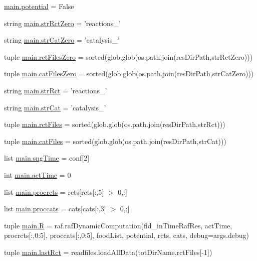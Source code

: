 \begin{DoxyCompactItemize}
\item 
\hyperlink{a00111_abe4c267a63409b1b7cd9c6aaf0779b4a}{main.\-potential} = False
\item 
string \hyperlink{a00111_adbfa32333003aa707723362b43bc11ff}{main.\-str\-Rct\-Zero} = 'reactions\-\_\-'
\item 
string \hyperlink{a00111_a6bb1e2c0e0d0a9e63313c082ee4eec76}{main.\-str\-Cat\-Zero} = 'catalysis\-\_\-'
\item 
tuple \hyperlink{a00111_aa37eddd86a00bf98dff8cc9260d6d13b}{main.\-rct\-Files\-Zero} = sorted(glob.\-glob(os.\-path.\-join(res\-Dir\-Path,str\-Rct\-Zero)))
\item 
tuple \hyperlink{a00111_a7ab6089d577bd60acf22b92e84930523}{main.\-cat\-Files\-Zero} = sorted(glob.\-glob(os.\-path.\-join(res\-Dir\-Path,str\-Cat\-Zero)))
\item 
string \hyperlink{a00111_a28a37e653a4c0984df32f8d83c3596ff}{main.\-str\-Rct} = 'reactions\-\_\-'
\item 
string \hyperlink{a00111_ab12df661b7defb4d7077777ad7d6352d}{main.\-str\-Cat} = 'catalysis\-\_\-'
\item 
tuple \hyperlink{a00111_a9016a8f5eafe76e4e8dbb1bc3ce94af5}{main.\-rct\-Files} = sorted(glob.\-glob(os.\-path.\-join(res\-Dir\-Path,str\-Rct)))
\item 
tuple \hyperlink{a00111_a189dc9cf606d870dacab059d5e7dca24}{main.\-cat\-Files} = sorted(glob.\-glob(os.\-path.\-join(res\-Dir\-Path,str\-Cat)))
\item 
list \hyperlink{a00111_ab4296f1ae2e4c4bb597ca27e84849510}{main.\-sng\-Time} = conf\mbox{[}2\mbox{]}
\item 
int \hyperlink{a00111_a9c2013c88f8354ccf6504c51843f1d5e}{main.\-act\-Time} = 0
\item 
list \hyperlink{a00111_a2120e8355b3501aed0114a74091d56c1}{main.\-procrcts} = rcts\mbox{[}rcts\mbox{[}\-:,5\mbox{]} $>$ 0,\-:\mbox{]}
\item 
list \hyperlink{a00111_a4e3c4b627d098aef6c7905cb20683e07}{main.\-proccats} = cats\mbox{[}cats\mbox{[}\-:,3\mbox{]} $>$ 0,\-:\mbox{]}
\item 
tuple \hyperlink{a00111_aa51f04a64cdea4fbde3c2d484d06d443}{main.\-R} = raf.\-raf\-Dynamic\-Computation(fid\-\_\-in\-Time\-Raf\-Res, act\-Time, procrcts\mbox{[}\-:,0\-:5\mbox{]}, proccats\mbox{[}\-:,0\-:5\mbox{]}, food\-List, potential, rcts, cats, debug=args.\-debug)
\item 
tuple \hyperlink{a00111_a519d451fb14acb6fb50a108ac2b8b261}{main.\-last\-Rct} = readfiles.\-load\-All\-Data(tot\-Dir\-Name,rct\-Files\mbox{[}-\/1\mbox{]})

\end{DoxyCompactItemize}
